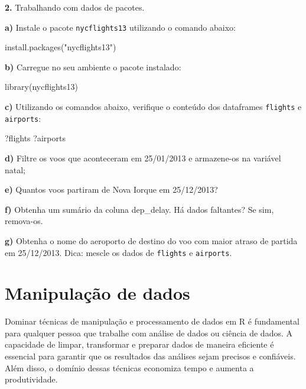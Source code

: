 \documentclass[
  portuguese,
  letterpaper,
  DIV=11,
  numbers=noendperiod]{scrreprt}
\newenvironment{Shaded}{\begin{snugshade}}{\end{snugshade}}
\newcommand{\FunctionTok}[1]{\textcolor[rgb]{0.28,0.35,0.67}{#1}}
\newcommand{\NormalTok}[1]{\textcolor[rgb]{0.00,0.23,0.31}{#1}}
\newcommand{\StringTok}[1]{\textcolor[rgb]{0.13,0.47,0.30}{#1}}
\theoremstyle{definition}
\theoremstyle{remark}
\begin{document}
\textbf{2.} Trabalhando com dados de pacotes.

\textbf{a)} Instale o pacote \texttt{nycflights13} utilizando o comando
abaixo:

\begin{Shaded}
\begin{Highlighting}[]
\FunctionTok{install.packages}\NormalTok{(}\StringTok{"nycflights13"}\NormalTok{)}
\end{Highlighting}
\end{Shaded}

\textbf{b)} Carregue no seu ambiente o pacote instalado:

\begin{Shaded}
\begin{Highlighting}[]
\FunctionTok{library}\NormalTok{(nycflights13)}
\end{Highlighting}
\end{Shaded}

\textbf{c)} Utilizando os comandos abaixo, verifique o conteúdo dos
dataframes \texttt{flights} e \texttt{airports}:

\begin{Shaded}
\begin{Highlighting}[]
\NormalTok{?flights}
\NormalTok{?airports}
\end{Highlighting}
\end{Shaded}

\textbf{d)} Filtre os voos que aconteceram em 25/01/2013 e armazene-os
na variável natal;

\textbf{e)} Quantos voos partiram de Nova Iorque em 25/12/2013?

\textbf{f)} Obtenha um sumário da coluna dep\_delay. Há dados faltantes?
Se sim, remova-os.

\textbf{g)} Obtenha o nome do aeroporto de destino do voo com maior
atraso de partida em 25/12/2013. Dica: mescle os dados de
\texttt{flights} e \texttt{airports}.

\chapter{Manipulação de dados}\label{manipulauxe7uxe3o-de-dados}

Dominar técnicas de manipulação e processamento de dados em R é
fundamental para qualquer pessoa que trabalhe com análise de dados ou
ciência de dados. A capacidade de limpar, transformar e preparar dados
de maneira eficiente é essencial para garantir que os resultados das
análises sejam precisos e confiáveis. Além disso, o domínio dessas
técnicas economiza tempo e aumenta a produtividade.
\end{document}
